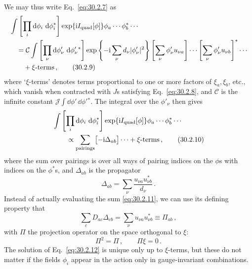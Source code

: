 We may thus write Eq.~\eqref{eq:30.2.7} as
\begin{align}
  &\int\left[\prod_i \mathop{}\!\mathrm{d}\phi_i\,\mathop{}\!\mathrm{d}\phi_i^*\right]
    \exp\{\mathrm{i} I_{\mathrm{quad}}[\phi]\}
    \phi_a\cdots\phi_b^*\cdots
  \notag\\
  &\quad={}
    \mathcal{C}\int
    \left[\prod_\nu \mathop{}\!\mathrm{d}\phi'_\nu\,\mathop{}\!\mathrm{d}\phi_\nu'{}^*\right]
    \exp\left\{-\mathrm{i}\sum_\nu d_\nu|\phi'_\nu|^2\right\}
    \left[\sum_\nu\phi'_\nu u_{\nu a}\right]\cdots
    \left[\sum_\nu\phi'_\nu u_{\nu b}\right]^*
    \cdots
  \notag\\
  &\qquad+\xi\text{-terms}\,,
  \tag{30.2.9}\label{eq:30.2.9}
\end{align}
where `\(\xi\)-terms' denotes terms proportional to one or more factors of
\(\xi_a,\xi_b\), etc., which vanish when contracted with \(J\)s satisfying
Eq.~\eqref{eq:30.2.8}, and \(\mathcal{C}\) is the infinite constant
\(\mathcal{J}\int \dd\phi'\,\dd\phi'{}^*\). The integral over the \(\phi'_\nu\) then gives
\begin{align}
  &\int\left[\prod_i \mathop{}\!\mathrm{d}\phi_i\,\mathop{}\!\mathrm{d}\phi_i^*\right]
    \exp\{\mathrm{i} I_{\mathrm{quad}}[\phi]\}
    \phi_a\cdots\phi_b^*\cdots
  \notag\\
  &\qquad\propto
    \sum_{\text{pairings}}\bigl[-\mathrm{i}\Delta_{ab}\bigr]\cdots
    +\xi\text{-terms}\,,
  \tag{30.2.10}\label{eq:30.2.10}
\end{align}
where the sum over pairings is over all ways of pairing indices on the
\(\phi\)s with indices on the \(\phi^*\)s, and \(\Delta_{ab}\) is the
propagator
\begin{equation}
  \Delta_{ab}=\sum_\nu\frac{u_{\nu a}u_{\nu b}^*}{d_\nu}\,.
  \tag{30.2.11}\label{eq:30.2.11}
\end{equation}
Instead of actually evaluating the sum \eqref{eq:30.2.11}, we can use its
defining property that
\begin{equation}
  \sum_cD_{ac}\Delta_{cb}
  =\sum_\nu u_{\nu a}u_{\nu b}^*
  \equiv\Pi_{ab}\,,
  \tag{30.2.12}\label{eq:30.2.12}
\end{equation}
with \(\Pi\) the projection operator on the space orthogonal to \(\xi\):
\begin{equation}
  \Pi^2=\Pi\,,
  \qquad
  \Pi\xi=0\,.
  \tag{30.2.13}\label{eq:30.2.13}
\end{equation}
The solution of Eq.~\eqref{eq:30.2.12} is unique only up to \(\xi\)-terms,
but these do not matter if the fields \(\phi_i\) appear in the action only in
gauge-invariant combinations.

